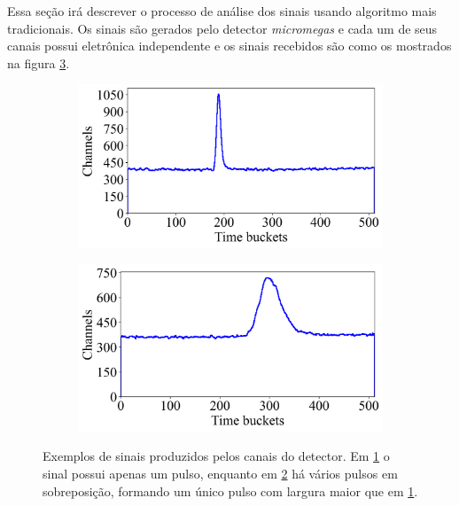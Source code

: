 \documentclass[a4paper,12pt,oneside]{book}
\begin{document}
\par Essa seção irá descrever o processo de análise dos sinais usando algoritmo mais tradicionais. Os sinais são gerados pelo detector \textit{micromegas} e cada um de seus canais possui eletrônica independente e os sinais recebidos são como os mostrados na figura \ref{fig:exemplos_sinais}.

\begin{figure}[H]
\centering
    \begin{subfigure}[b]{0.48\textwidth}
        \centering
        \includegraphics[scale=0.395]{figs/ex_sinal_1.png}
        \caption{}
        \label{subfig:exemplos_sinais_1}
    \end{subfigure}%
    \hfill
    \begin{subfigure}[b]{0.48\textwidth}
        \centering
        \includegraphics[scale=0.395]{figs/ex_sinal_2.png}
        \caption{}
        \label{subfig:exemplos_sinais_2}
    \end{subfigure}
\caption{Exemplos de sinais produzidos pelos canais do detector. Em \ref{subfig:exemplos_sinais_1} o sinal possui apenas um pulso, enquanto em \ref{subfig:exemplos_sinais_2} há vários pulsos em sobreposição, formando um único pulso com largura maior que em \ref{subfig:exemplos_sinais_1}.}
\label{fig:exemplos_sinais}
\end{figure}
\end{document}
